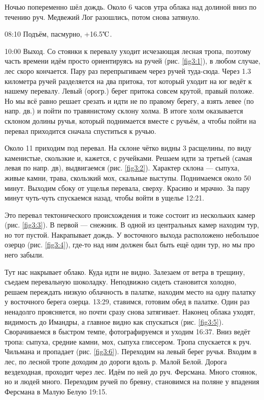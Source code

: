 Ночью попеременно шёл дождь. Около 6 часов утра облака над долиной вниз по течению руч. Медвежий Лог разошлись,
потом снова затянуло.

08:10 Подъём, пасмурно, +16.5$\tccentigrade$.

10:00 Выход.
Со стоянки к перевалу уходит исчезающая лесная тропа, поэтому часть времени идём просто ориентируясь на ручей (рис. \ref{fig3:1}),
в любом случае, лес скоро кончается. Пару раз перепрыгиваем через ручей туда-сюда.
Через 1.3 километра ручей разделяется на два притока, тот который уходит на юг ведёт к нашему перевалу.
Левый (орогр.) берег притока совсем крутой, правый положе. Но мы всё равно решает срезать и идти не по правому берегу,
а взять левее (по напр. дв.) и  пойти по травянистому склону холма. В итоге холм оказывается склоном долины ручья,
который поднимается вместе с ручьём, а чтобы пойти на перевал приходится сначала спуститься к ручью.

Около 11 приходим под перевал. На склоне чётко видны 3 расщелины, по виду каменистые, скользкие и, кажется, с ручейками.
Решаем идти за третьей (самая левая по напр. дв), выдвигаемся (рис. \ref{fig3:2}). Характер склона --- сыпуха, живые камни, трава,
скользкий мох, скальные выступы. Поднимаемся около 50 минут. Выходим сбоку от ущелья перевала, сверху.
Красиво и мрачно. За пару минут чуть-чуть спускаемся назад, чтобы войти в ущелье 12:21.

Это перевал тектонического происхождения и тоже состоит из нескольких камер (рис. \ref{fig3:3}). В первой --- снежник.
В одной из центральных камер находим тур, но тот пустой. Накрапывает дождь. У восточного выхода расположено
небольшое озерцо (рис. \ref{fig3:4}), где-то над ним должен был быть ещё один тур, но мы про него забыли.

Тут нас накрывает облако. Куда идти не видно. Залезаем от ветра в трещину, съедаем перевальную шоколадку.
Неподвижно сидеть становится холодно, решаем переждать низкую облачность в палатке, находим место на одну палатку
у восточного берега озерца. 13:29, ставимся, готовим обед в палатке. Один раз ненадолго проясняется,
но почти сразу снова затягивает. Наконец облака уходят, видимость до Имандры, а главное видно как спускаться (рис. \ref{fig3:5}).
Сворачиваемся в быстром темпе, фотографируемся и уходим 16:37.
Вниз ведёт тропа: сыпуха, средние камни, мох, сыпуха глиссером. Тропа спускается к руч. Чильмана и пропадает (рис. \ref{fig3:6}).
Переходим на левый берег ручья. Входим в лес, по лесной тропе доходим до дороги вдоль р. Малой Белой.
Дорога вездеходная, проходит через лес. Идём по ней до руч. Ферсмана. Много стоянок, но и людей много.
Переходим ручей по бревну, становимся на поляне у впадения Ферсмана в Малую Белую 19:15.


